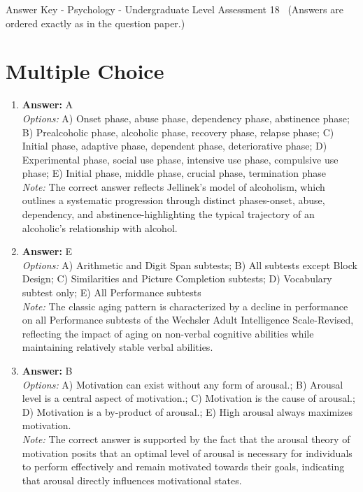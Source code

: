 \documentclass[12pt]{article}
\begin{document}
\begin{center}
Answer Key - Psychology - Undergraduate Level Assessment 18 \
\small (Answers are ordered exactly as in the question paper.)
\end{center}

\section*{Multiple Choice}
\begin{enumerate}[label=\arabic*.]
\item \textbf{Answer:} A
\\ \textit{Options:} A) Onset phase, abuse phase, dependency phase, abstinence phase; B) Prealcoholic phase, alcoholic phase, recovery phase, relapse phase; C) Initial phase, adaptive phase, dependent phase, deteriorative phase; D) Experimental phase, social use phase, intensive use phase, compulsive use phase; E) Initial phase, middle phase, crucial phase, termination phase
\\ \textit{Note:} The correct answer reflects Jellinek's model of alcoholism, which outlines a systematic progression through distinct phases-onset, abuse, dependency, and abstinence-highlighting the typical trajectory of an alcoholic's relationship with alcohol.
\item \textbf{Answer:} E
\\ \textit{Options:} A) Arithmetic and Digit Span subtests; B) All subtests except Block Design; C) Similarities and Picture Completion subtests; D) Vocabulary subtest only; E) All Performance subtests
\\ \textit{Note:} The classic aging pattern is characterized by a decline in performance on all Performance subtests of the Wechsler Adult Intelligence Scale-Revised, reflecting the impact of aging on non-verbal cognitive abilities while maintaining relatively stable verbal abilities.
\item \textbf{Answer:} B
\\ \textit{Options:} A) Motivation can exist without any form of arousal.; B) Arousal level is a central aspect of motivation.; C) Motivation is the cause of arousal.; D) Motivation is a by-product of arousal.; E) High arousal always maximizes motivation.
\\ \textit{Note:} The correct answer is supported by the fact that the arousal theory of motivation posits that an optimal level of arousal is necessary for individuals to perform effectively and remain motivated towards their goals, indicating that arousal directly influences motivational states.

\end{enumerate}
\end{document}
